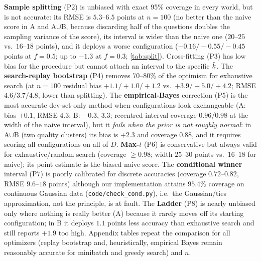 \textbf{Sample splitting} (P2) is unbiased with exact 95\% coverage in every world, but is not accurate: its RMSE is $5.3$--$6.5$ points at $n{=}100$ (no better than the naive score in A and A$\cup$B, because discarding half of the questions doubles the sampling variance of the score), its interval is wider than the naive one ($20$--$25$ vs.\ $16$--$18$ points), and it deploys a worse configuration ($-0.16/-0.55/-0.45$ points at $f{=}0.5$; up to $-1.3$ at $f{=}0.3$; \cref{tab:split}). Cross-fitting (P3) has low bias for the procedure but cannot attach an interval to the specific $\hat k$. The \textbf{search-replay bootstrap} (P4) removes $70$--$80\%$ of the optimism for exhaustive search (at $n{=}100$ residual bias $+1.1/+1.0/+1.2$ vs.\ $+3.9/+5.0/+4.2$; RMSE $4.6/3.7/4.8$, lower than splitting). The \textbf{empirical-Bayes} correction (P5) is the most accurate dev-set-only method when configurations look exchangeable (A: bias $+0.1$, RMSE $4.3$; B: $-0.3$, $3.3$; recentred interval coverage $0.96$/$0.98$ at the width of the naive interval), but it \emph{fails when the prior is not roughly normal}: in A$\cup$B (two quality clusters) its bias is $+2.3$ and coverage $0.88$, and it requires scoring all configurations on all of $D$. \textbf{Max-$t$} (P6) is conservative but always valid for exhaustive/random search (coverage $\ge0.98$; width $25$--$30$ points vs.\ $16$--$18$ for naive); its point estimate is the biased naive score. The \textbf{conditional winner} interval (P7) is poorly calibrated for discrete accuracies (coverage $0.72$--$0.82$, RMSE $9.6$--$18$ points) although our implementation attains $95.4\%$ coverage on continuous Gaussian data (\texttt{code/check\_cond.py}), i.e.\ the Gaussian/ties approximation, not the principle, is at fault. The \textbf{Ladder} (P8) is nearly unbiased only where nothing is really better (A) because it rarely moves off its starting configuration; in B it deploys $1.1$ points less accuracy than exhaustive search and still reports $+1.9$ too high. Appendix tables repeat the comparison for all optimizers (replay bootstrap and, heuristically, empirical Bayes remain reasonably accurate for minibatch and greedy search) and $n$.

\begin{table}[t]
\caption{Cost and accuracy of sample splitting, exhaustive search, $n{=}100$. `cost' = loss in true accuracy of the deployed configuration relative to selecting with all $n$ (points).}\label{tab:split}
\centering\scriptsize\setlength{\tabcolsep}{3pt}

\end{table}
